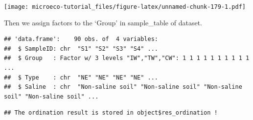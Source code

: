 \documentclass[
]{book}
\newenvironment{Shaded}{\begin{snugshade}}{\end{snugshade}}
\newcommand{\AttributeTok}[1]{\textcolor[rgb]{0.77,0.63,0.00}{#1}}
\newcommand{\ConstantTok}[1]{\textcolor[rgb]{0.00,0.00,0.00}{#1}}
\newcommand{\FunctionTok}[1]{\textcolor[rgb]{0.00,0.00,0.00}{#1}}
\newcommand{\NormalTok}[1]{#1}
\newcommand{\OtherTok}[1]{\textcolor[rgb]{0.56,0.35,0.01}{#1}}
\newcommand{\SpecialCharTok}[1]{\textcolor[rgb]{0.00,0.00,0.00}{#1}}
\newcommand{\StringTok}[1]{\textcolor[rgb]{0.31,0.60,0.02}{#1}}
\begin{document}
\begin{Shaded}
\end{Shaded}

\texttt{[image: microeco-tutorial\_files/figure-latex/unnamed-chunk-179-1.pdf]}

Then we assign factors to the `Group' in sample\_table of dataset.

\begin{Shaded}
\end{Shaded}

\begin{verbatim}
## 'data.frame':    90 obs. of  4 variables:
##  $ SampleID: chr  "S1" "S2" "S3" "S4" ...
##  $ Group   : Factor w/ 3 levels "IW","TW","CW": 1 1 1 1 1 1 1 1 1 1 ...
##  $ Type    : chr  "NE" "NE" "NE" "NE" ...
##  $ Saline  : chr  "Non-saline soil" "Non-saline soil" "Non-saline soil" "Non-saline soil" ...
\end{verbatim}

\begin{Shaded}
\end{Shaded}

\begin{verbatim}
## The ordination result is stored in object$res_ordination !
\end{verbatim}
\end{document}

